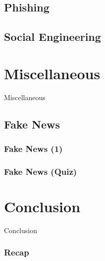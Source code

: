 \documentclass[aspectratio=169,dvipsnames]{beamer}
\begin{document}
\subsection{Phishing}

\subsection{Social Engineering}


\section{Miscellaneous}
\begin{frame}
\begin{center}
\huge Miscellaneous
\end{center}
\end{frame}

\subsection{Fake News}

\begin{frame}
\frametitle{Fake News (1)}
\end{frame}


\begin{frame}
\frametitle{Fake News (Quiz)}
\end{frame}




\section{Conclusion}
\begin{frame}
\begin{center}
\huge Conclusion
\end{center}
\end{frame}

\begin{frame}
\frametitle{Recap}
\end{frame}
\end{document}

